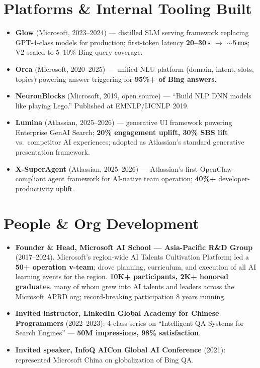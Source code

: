 \documentclass[10.5pt,letterpaper]{article}
\begin{document}
\section*{Platforms \& Internal Tooling Built}
\begin{itemize}
  \item \textbf{Glow} (Microsoft, 2023--2024) --- distilled SLM serving framework replacing GPT-4-class models for production; first-token latency \textbf{20--30\,s $\to$ $\sim$5\,ms}; V2 scaled to 5--10\% Bing query coverage.
  \item \textbf{Orca} (Microsoft, 2020--2025) --- unified NLU platform (domain, intent, slots, topics) powering answer triggering for \textbf{95\%+ of Bing answers}.
  \item \textbf{NeuronBlocks} (Microsoft, 2019, open source) --- ``Build NLP DNN models like playing Lego.'' Published at EMNLP/IJCNLP 2019.
  \item \textbf{Lumina} (Atlassian, 2025--2026) --- generative UI framework powering Enterprise GenAI Search; \textbf{20\% engagement uplift, 30\% SBS lift} vs.\ competitor AI experiences; adopted as Atlassian's standard generative presentation framework.
  \item \textbf{X-SuperAgent} (Atlassian, 2025--2026) --- Atlassian's first OpenClaw-compliant agent framework for AI-native team operation; \textbf{40\%+} developer-productivity uplift.
\end{itemize}

\section*{People \& Org Development}
\begin{itemize}
  \item \textbf{Founder \& Head, Microsoft AI School --- Asia-Pacific R\&D Group} (2017--2024). Microsoft's region-wide AI Talents Cultivation Platform; led a \textbf{50+ operation v-team}; drove planning, curriculum, and execution of all AI learning events for the region. \textbf{10K+ participants, 2K+ honored graduates}, many of whom grew into AI talents and leaders across the Microsoft APRD org; record-breaking participation 8 years running.
  \item \textbf{Invited instructor, LinkedIn Global Academy for Chinese Programmers} (2022--2023): 4-class series on ``Intelligent QA Systems for Search Engines'' --- \textbf{50M impressions, 98\% satisfaction}.
  \item \textbf{Invited speaker, InfoQ AICon Global AI Conference} (2021): represented Microsoft China on globalization of Bing QA.
\end{itemize}
\end{document}
